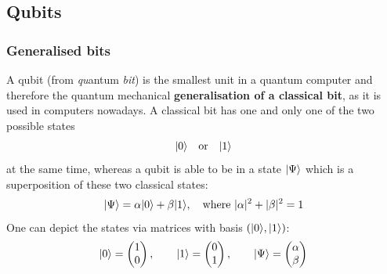 \documentclass[bibliography=totocnumbered, 10pt]{article}
\theoremstyle{NoticeStyle}
\begin{document}
\subsection{Qubits}\label{sec:Qubits}

\subsubsection{Generalised bits}
A qubit (from \textit{qu}antum \textit{bit}) is the smallest unit in a quantum computer and therefore the quantum mechanical \textbf{generalisation of a classical bit}, as it is used in computers nowadays. A classical bit has one and only one of the two possible states
%
\begin{align}
	{\left\vert{0}\right\rangle} \quad \text{or} \quad {\left\vert{1}\right\rangle}
\end{align}
%
at the same time, whereas a qubit is able to be in a state ${\left\vert{\Psi}\right\rangle}$ which is a superposition of these two classical states:
%
\begin{align}
	{\left\vert{\Psi}\right\rangle} = \alpha {\left\vert{0}\right\rangle} + \beta {\left\vert{1}\right\rangle}, \quad \text{where }|\alpha|^2 + |\beta|^2 = 1	\label{eq:Superpos of qubit}
\end{align}
%
%
One can depict the states via matrices with basis $({\left\vert{0}\right\rangle}, {\left\vert{1}\right\rangle})$:
\begin{align}
	{\left\vert{0}\right\rangle} = \begin{pmatrix}1\\0 \end{pmatrix}, \quad\quad {\left\vert{1}\right\rangle} = \begin{pmatrix}0\\1 \end{pmatrix}, \quad\quad {\left\vert{\Psi}\right\rangle} = \begin{pmatrix}\alpha\\\beta \end{pmatrix}
\end{align}
\end{document}
